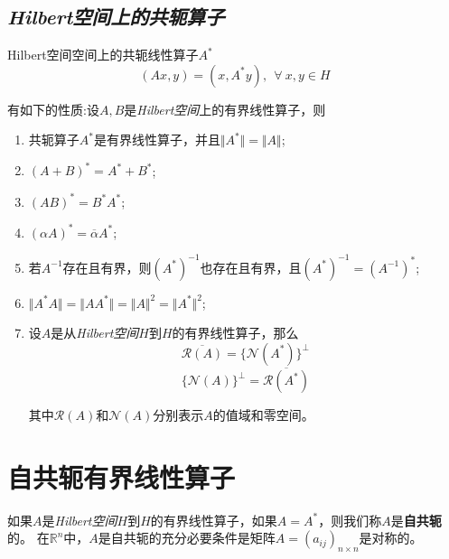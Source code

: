 \subsection*{\textsl{Hilbert空间上的共轭算子}}

Hilbert空间空间上的共轭线性算子$A^*$
\begin{equation}
    (Ax,y)=(x,A^*y),\ \ \forall\ x,y\in H
\end{equation}

有如下的性质:设$A,B$是\textsl{Hilbert空间}上的有界线性算子，则
\begin{enumerate}[itemindent=2em]
    \item 共轭算子$A^*$是有界线性算子，并且$\Vert A^*\Vert=\Vert A\Vert$;
    \item $(A+B)^*=A^*+B^*$;
    \item $(AB)^*=B^*A^*$;
    \item $(\alpha A)^*=\overline{\alpha}A^*$;
    \item 若$A^{-1}$存在且有界，则$(A^*)^{-1}$也存在且有界，且$(A^*)^{-1}=(A^{-1})^*$;
    \item $\Vert A^*A\Vert=\Vert AA^*\Vert=\Vert A\Vert^2=\Vert A^*\Vert^2$;
    \item 设$A$是从\textsl{Hilbert空间}$H$到$H$的有界线性算子，那么
    \begin{equation}
        \overline{\mathcal{R}(A)}=\{\mathcal{N}(A^*)\}^{\perp}
    \end{equation}
    \begin{equation}
        \{\mathcal{N}(A)\}^\perp=\overline{\mathcal{R}(A^*)}
    \end{equation}

    其中$\mathcal{R}(A)$和$\mathcal{N}(A)$分别表示$A$的值域和零空间。
\end{enumerate}

\section{自共轭有界线性算子}

如果$A$是\textsl{Hilbert空间}$H$到$H$的有界线性算子，如果$A=A^*$，则我们称$A$是\textbf{自共轭}的。
在$\mathbb{R}^n$中，$A$是自共轭的充分必要条件是矩阵$A=(a_{ij})_{n\times n}$是对称的。


